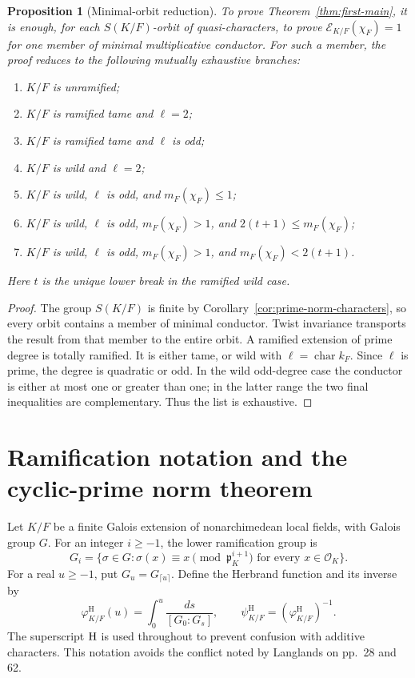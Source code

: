 \documentclass[11pt]{amsart}
\newtheorem{proposition}[theorem]{Proposition}
\theoremstyle{definition}
\theoremstyle{remark}
\newcommand{\cO}{\mathcal O}
\newcommand{\p}{\mathfrak p}
\newcommand{\Err}{\mathcal E}
\newcommand{\HerbPhi}{\varphi^{\mathrm H}}
\newcommand{\HerbPsi}{\psi^{\mathrm H}}
\begin{document}
\begin{proposition}[Minimal-orbit reduction]\label{prop:minimal-orbit-reduction}
To prove Theorem~\ref{thm:first-main}, it is enough, for each
$S(K/F)$-orbit of quasi-characters, to prove
$\Err_{K/F}(\chi_F)=1$ for one member of minimal multiplicative
conductor.  For such a member, the proof reduces to the following
mutually exhaustive branches:
\begin{enumerate}[label=\textup{(\roman*)}]
\item $K/F$ is unramified;
\item $K/F$ is ramified tame and $\ell=2$;
\item $K/F$ is ramified tame and $\ell$ is odd;
\item $K/F$ is wild and $\ell=2$;
\item $K/F$ is wild, $\ell$ is odd, and $m_F(\chi_F)\le1$;
\item $K/F$ is wild, $\ell$ is odd, $m_F(\chi_F)>1$, and
      $2(t+1)\le m_F(\chi_F)$;
\item $K/F$ is wild, $\ell$ is odd, $m_F(\chi_F)>1$, and
      $m_F(\chi_F)<2(t+1)$.
\end{enumerate}
Here $t$ is the unique lower break in the ramified wild case.
\end{proposition}

\begin{proof}
The group $S(K/F)$ is finite by
Corollary~\ref{cor:prime-norm-characters}, so every orbit contains a
member of minimal conductor.  Twist invariance transports the result
from that member to the entire orbit.  A ramified extension of prime degree is
totally ramified.  It is either tame, or wild with
$\ell=\operatorname{char}k_F$.  Since $\ell$ is prime, the degree is
quadratic or odd.  In the wild odd-degree case the conductor is either
at most one or greater than one; in the latter range the two final
inequalities are complementary.  Thus the list is exhaustive.
\end{proof}

\section{Ramification notation and the cyclic-prime norm theorem}

Let $K/F$ be a finite Galois extension of nonarchimedean local fields,
with Galois group $G$.  For an integer $i\geq -1$, the lower
ramification group is
\[
 G_i=\{\sigma\in G:\sigma(x)\equiv x\pmod{\p_K^{i+1}}
                      \text{ for every }x\in\cO_K\}.
\]
For a real $u\geq-1$, put $G_u=G_{\lceil u\rceil}$.  Define the
Herbrand function and its inverse by
\begin{equation}\label{eq:Herbrand-def}
 \HerbPhi_{K/F}(u)=\int_0^u\frac{ds}{[G_0:G_s]},
 \qquad
 \HerbPsi_{K/F}=(\HerbPhi_{K/F})^{-1}.
\end{equation}
The superscript ${\rm H}$ is used throughout to prevent confusion with
additive characters.  This notation avoids the conflict noted by Langlands on pp.~28 and 62.
\end{document}
